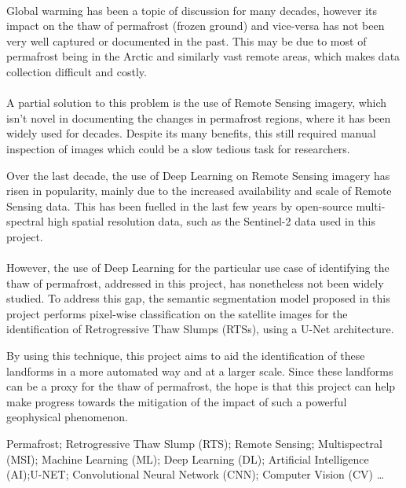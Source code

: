 \paragraph{}
Global warming has been a topic of discussion for many decades, however its impact on the thaw of permafrost (frozen ground) and vice-versa has not been very well captured or documented in the past. This may be due to most of permafrost being in the Arctic and similarly vast remote areas, which makes data collection difficult and costly.
\paragraph{}
A partial solution to this problem is the use of Remote Sensing imagery, which isn't novel in documenting the changes in permafrost regions, where it has been widely used for decades. Despite its many benefits, this still required manual inspection of images which could be a slow tedious task for researchers.

Over the last decade, the use of Deep Learning on Remote Sensing imagery has risen in popularity, mainly due to the increased availability and scale of Remote Sensing data. This has been fuelled in the last few years by open-source multi-spectral high spatial resolution data, such as the Sentinel-2 data used in this project.
\paragraph{}
However, the use of Deep Learning for the particular use case of identifying the thaw of permafrost, addressed in this project, has nonetheless not been widely studied. To address this gap, the semantic segmentation model proposed in this project performs pixel-wise classification on the satellite images for the identification of Retrogressive Thaw Slumps (RTSs), using a U-Net architecture.

By using this technique, this project aims to aid the identification of these landforms in a more automated way and at a larger scale.
Since these landforms can be a proxy for the thaw of permafrost, the hope is that this project can help make progress towards the mitigation of the impact of such a powerful geophysical phenomenon.

\begin{keywords}
Permafrost; Retrogressive Thaw Slump (RTS); Remote Sensing;  Multispectral  (MSI); Machine Learning (ML); Deep Learning (DL); Artificial Intelligence (AI);U-NET; Convolutional Neural Network (CNN); Computer Vision (CV) \ldots
\end{keywords} 
